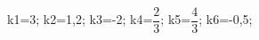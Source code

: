 \documentclass[exercice]{thedocument}%
\begin{document}
%
    \>k1=3;%
    \>k2=1,2;%
    \>k3=-2;%
    \>k4=$\dfrac23$;%
    \>k5=$\dfrac43$;%
    \>k6=-0,5;%
\end{document}
